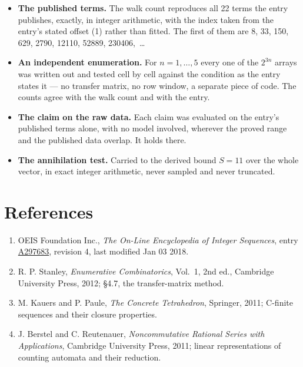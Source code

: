 \documentclass[11pt]{article}
\theoremstyle{definition}
\begin{document}
\begin{itemize}

\item {\bfseries The published terms.} The walk count reproduces all 22 terms the entry publishes, exactly, in integer arithmetic, with the index taken from the entry's stated offset (1) rather than fitted. The first of them are 8, 33, 150, 629, 2790, 12110, 52889, 230406,~\dots

\item {\bfseries An independent enumeration.} For $n = 1,\dots,5$ every one of the $2^{3n}$ arrays was written out and tested cell by cell against the condition as the entry states it --- no transfer matrix, no row window, a separate piece of code. The counts agree with the walk count and with the entry.

\item {\bfseries The claim on the raw data.} Each claim was evaluated on the entry's published terms alone, with no model involved, wherever the proved range and the published data overlap. It holds there.

\item {\bfseries The annihilation test.} Carried to the derived bound $S = 11$ over the whole vector, in exact integer arithmetic, never sampled and never truncated.

\end{itemize}

\section{References}

\begin{enumerate}

\item OEIS Foundation Inc., \emph{The On-Line Encyclopedia of Integer Sequences}, entry \href{https://oeis.org/A297683}{A297683}, revision 4, last modified Jan 03 2018.

\item R. P. Stanley, \emph{Enumerative Combinatorics}, Vol.~1, 2nd ed., Cambridge University Press, 2012; \S4.7, the transfer-matrix method.

\item M. Kauers and P. Paule, \emph{The Concrete Tetrahedron}, Springer, 2011; C-finite sequences and their closure properties.

\item J. Berstel and C. Reutenauer, \emph{Noncommutative Rational Series with Applications}, Cambridge University Press, 2011; linear representations of counting automata and their reduction.

\end{enumerate}
\end{document}
